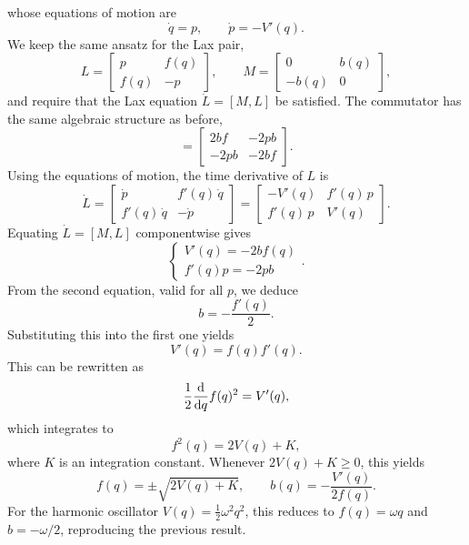 whose equations of motion are
\begin{equation}
    \dot q = p, \qquad \dot p = -V'(q).
\end{equation}
We keep the same ansatz for the Lax pair,
\begin{equation}
    L =
    \begin{bmatrix}
        p & f(q) \\
        f(q) & -p
    \end{bmatrix},
    \qquad
    M =
    \begin{bmatrix}
        0 & b(q) \\
        -b(q) & 0
    \end{bmatrix},
\end{equation}
and require that the Lax equation $\dot L = [M,L]$
be satisfied.
The commutator has the same algebraic structure as before,
\begin{equation}
    [M,L] =
    \begin{bmatrix}
        2 b f & -2 p b \\
        -2 p b & -2 b f
    \end{bmatrix}.
\end{equation}
Using the equations of motion, the time derivative of $L$ is
\begin{equation}
    \dot L =
    \begin{bmatrix}
    \dot p & f'(q)\, \dot q \\
    f'(q) \, \dot q & -\dot p
    \end{bmatrix}
    =
    \begin{bmatrix}
    - V'(q) & f'(q) \, p \\
    f'(q) \, p & V'(q)
    \end{bmatrix}.
\end{equation}
Equating $\dot L = [M,L]$ componentwise gives
\begin{equation}
    \begin{cases}
        V'(q) = - 2 b f(q) \\
        f'(q) p = - 2 p b
    \end{cases}.
\end{equation}
From the second equation, valid for all $p$, we deduce
\begin{equation}
    b = - \frac{f'(q)}{2}.
\end{equation}
Substituting this into the first one yields
\begin{equation}
    V'(q) = f(q) f'(q).
\end{equation}
This can be rewritten as
\begin{equation}
    \frac{1}{2}\dv{}{q} f(q)^2 = V'(q),
\end{equation}
which integrates to
\begin{equation}
    f^2(q) = 2 V(q) + K,
\end{equation}
where $K$ is an integration constant. Whenever $2V(q)+K \ge 0$, this yields
\begin{equation}
    f(q) = \pm \sqrt{2 V(q) + K},
    \qquad
    b(q) = -\frac{V'(q)}{2f(q)}.
\end{equation}
For the harmonic oscillator $V(q) = \tfrac{1}{2}\omega^2 q^2$,
this reduces to $f(q) = \omega q$ and $b = - \omega/2$,
reproducing the previous result.